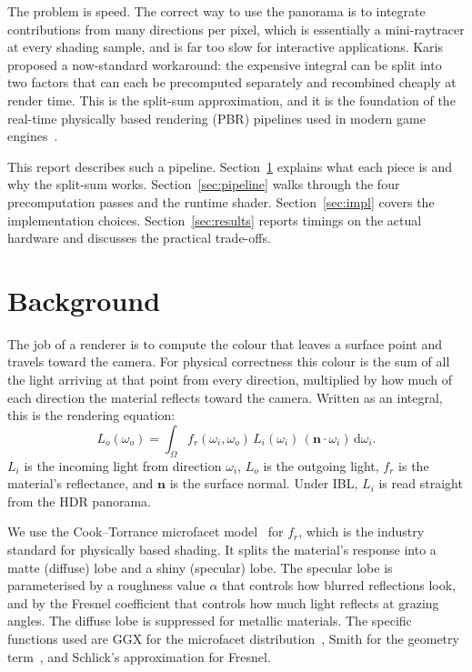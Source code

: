 \documentclass{egpubl}
\begin{document}
The problem is speed. The correct way to use the panorama is to integrate
contributions from many directions per pixel, which is essentially a
mini-raytracer at every shading sample, and is far too slow for interactive
applications. Karis~\cite{Karis2013} proposed a now-standard workaround: the
expensive integral can be split into two factors that can each be precomputed
separately and recombined cheaply at render time. This is the split-sum
approximation, and it is the foundation of the real-time physically based
rendering (PBR) pipelines used in modern game engines~\cite{Burley2012}.

This report describes such a pipeline. Section~\ref{sec:background} explains
what each piece is and why the split-sum works. Section~\ref{sec:pipeline}
walks through the four precomputation passes and the runtime shader.
Section~\ref{sec:impl} covers the implementation choices.
Section~\ref{sec:results} reports timings on the actual hardware and discusses
the practical trade-offs.

\section{Background}\label{sec:background}

The job of a renderer is to compute the colour that leaves a surface point and
travels toward the camera. For physical correctness this colour is the sum of
all the light arriving at that point from every direction, multiplied by how
much of each direction the material reflects toward the camera. Written as an
integral, this is the rendering equation:
\begin{equation}
L_o(\omega_o) = \int_\Omega f_r(\omega_i, \omega_o)\,L_i(\omega_i)\,
                  (\mathbf{n}\cdot\omega_i)\,\mathrm{d}\omega_i.
\label{eq:rendering}
\end{equation}
$L_i$ is the incoming light from direction $\omega_i$, $L_o$ is the outgoing
light, $f_r$ is the material's reflectance, and $\mathbf{n}$ is the surface
normal. Under IBL, $L_i$ is read straight from the HDR panorama.

We use the Cook--Torrance microfacet model~\cite{CookTorrance1982} for $f_r$,
which is the industry standard for physically based shading. It splits the
material's response into a matte (diffuse) lobe and a shiny (specular) lobe.
The specular lobe is parameterised by a roughness value $\alpha$ that
controls how blurred reflections look, and by the Fresnel coefficient that
controls how much light reflects at grazing angles. The diffuse lobe is
suppressed for metallic materials. The specific functions used are GGX for
the microfacet distribution~\cite{Walter2007}, Smith for the geometry
term~\cite{Heitz2014}, and Schlick's approximation for Fresnel.
\end{document}
